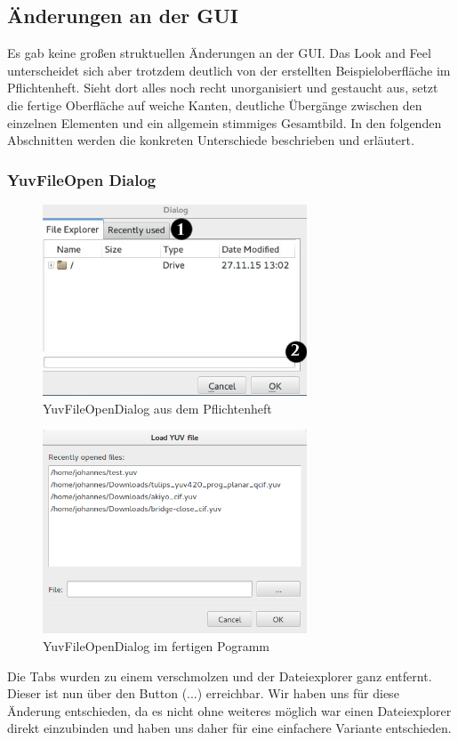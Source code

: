 \documentclass{scrartcl}
\begin{document}
{\subsection{Änderungen an der GUI}
Es gab keine großen struktuellen Änderungen an der GUI. Das Look and Feel unterscheidet sich aber trotzdem deutlich von der erstellten Beispieloberfläche im Pflichtenheft. Sieht dort alles noch recht unorganisiert und gestaucht aus, setzt die fertige Oberfläche auf weiche Kanten, deutliche Übergänge zwischen den einzelnen Elementen und ein allgemein stimmiges Gesamtbild. In den folgenden Abschnitten werden die konkreten Unterschiede beschrieben und erläutert.
\newpage
\subsubsection{YuvFileOpen Dialog}
\bigskip
\begin{figure}[ht]
\centering
\includegraphics[width=0.7\textwidth]{Pictures/fileopenalt.jpg}
\caption{YuvFileOpenDialog aus dem Pflichtenheft}
\end{figure}
\begin{figure}[ht]
\centering
\includegraphics[width=0.7\textwidth]{Pictures/fileopenneu.png}
\caption{YuvFileOpenDialog im fertigen Pogramm}
\end{figure}
Die Tabs wurden zu einem verschmolzen und der Dateiexplorer ganz entfernt. Dieser ist nun über den Button (...) erreichbar. Wir haben uns für diese Änderung entschieden, da es nicht ohne weiteres möglich war einen Dateiexplorer direkt einzubinden und haben uns daher für eine einfachere Variante entschieden.
\newpage
}
\end{document}
